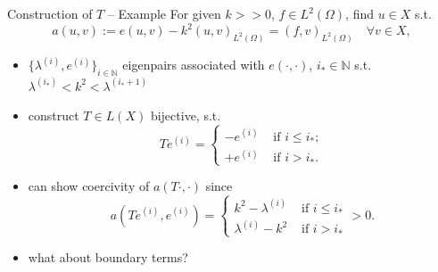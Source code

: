 \documentclass[11pt,aspectratio=169,xcolor=dvipsnames]{beamer}
\newcommand{\lami}{\lambda^{(i)}}
\newcommand{\ei}{e^{(i)}}
\newcommand{\nicearrow}[2]{\raisebox{#2}{\resizebox{0.45cm}{!}{\color{#1}{\MVRightArrow}\color{black}}}}
\begin{document}
\begin{frame}{Construction of $T$ -- Example}
  For given $k >\!\!> 0$, $f \in L^2(\Omega)$, find $u \in X$ s.t. 
  \begin{equation}\label{eq:HelmholtzAbstract}
    a(u,v) := e(u,v) - k^2(u,v)_{L^2(\Omega)} = (f,v)_{L^2(\Omega)} \quad \forall v \in X, \tag{P}
  \end{equation}
  \begin{itemize}
    \item<2->[\nicearrow{GOE}{-0.07cm}] $\{ \lami, \ei \}_{i \in \mathbb{N}}$ eigenpairs associated with $e(\cdot,\cdot)$, $i_{\ast} \in \mathbb{N}$ s.t. $\lambda^{(i_{\ast})} < k^2 < \lambda^{(i_{\ast} + 1)}$
    \item<3->[\nicearrow{GOE}{-0.07cm}] construct $T \in L(X)$ bijective, s.t. 
    \begin{equation*}
      T \ei = \begin{cases}
        - \ei &\text{ if } i \le i_{\ast}; \\
        + \ei &\text{ if } i > i_{\ast}.
      \end{cases}
    \end{equation*}
    \item<4->[\nicearrow{GOE}{-0.07cm}] can show coercivity of $a(T \cdot, \cdot)$ since 
    \begin{equation*}
      a(T \ei,\ei) = \begin{cases}
        k^2 - \lami &\text{ if } i \le i_{\ast} \\
        \lami - k^2 &\text{ if } i > i_{\ast}
      \end{cases} > 0.
    \end{equation*}
    \item<5->[\nicearrow{GOE}{-0.07cm}] what about boundary terms?
  \end{itemize}
\end{frame}
\end{document}
